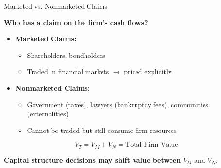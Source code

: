 \begin{frame}{Marketed vs. Nonmarketed Claims}
	
	\textbf{Who has a claim on the firm's cash flows?}
	
	\vspace{0.2cm}
	\begin{itemize}
		\item \textbf{Marketed Claims:}
		\begin{itemize}
			\item Shareholders, bondholders
			\item Traded in financial markets $\rightarrow$ priced explicitly
		\end{itemize}
		
		\item \textbf{Nonmarketed Claims:}
		\begin{itemize}
			\item Government (taxes), lawyers (bankruptcy fees), communities (externalities)
			\item Cannot be traded but still consume firm resources
		\end{itemize}
	\end{itemize}
	
	\vspace{0.3cm}
	\[
	V_T = V_M + V_N = \text{Total Firm Value}
	\]
	
	\vspace{0.2cm}
	\textbf{Capital structure decisions may shift value between} $V_M$ and $V_N$.
\end{frame}

